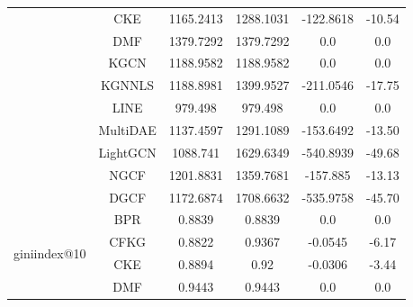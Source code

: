 \begin{table}[H]
{\begin{tabular}{|c|c|c|c|c|c|}
                                                     & CKE      & 1165.2413              & 1288.1031                 & -122.8618         & -10.54          \\ \cline{2-6}
                                                     & DMF      & 1379.7292              & 1379.7292                 & 0.0               & 0.0               \\ \cline{2-6}
                                                     & KGCN     & 1188.9582              & 1188.9582                 & 0.0               & 0.0               \\ \cline{2-6}
                                                     & KGNNLS   & 1188.8981              & 1399.9527                 & -211.0546         & -17.75          \\ \cline{2-6}
                                                     & LINE     & 979.498                & 979.498                   & 0.0               & 0.0               \\ \cline{2-6}
                                                     & MultiDAE & 1137.4597              & 1291.1089                 & -153.6492         & -13.50          \\ \cline{2-6}
                                                     & LightGCN & 1088.741               & 1629.6349                 & -540.8939         & -49.68          \\ \cline{2-6}
                                                     & NGCF     & 1201.8831              & 1359.7681                 & -157.885          & -13.13          \\ \cline{2-6}
                                                     & DGCF     & 1172.6874              & 1708.6632                 & -535.9758         & -45.70          \\ \hline
            \multirow{11}{*}{giniindex@10} & BPR      & 0.8839                  & 0.8839                    & 0.0               & 0.0               \\ \cline{2-6}
                                           & CFKG     & 0.8822                  & 0.9367                    & -0.0545           & -6.17           \\ \cline{2-6}
                                           & CKE      & 0.8894                  & 0.92                      & -0.0306           & -3.44           \\ \cline{2-6}
                                           & DMF      & 0.9443                  & 0.9443                    & 0.0               & 0.0               \\ \cline{2-6}

\end{tabular}}
\end{table}
